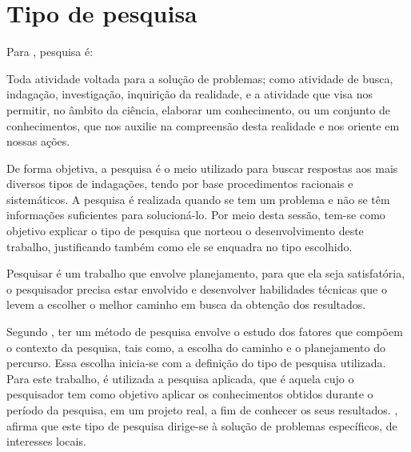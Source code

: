\section{Tipo de pesquisa}

\par Para , pesquisa é:

\begin{citacao}
	Toda atividade voltada para a solução de problemas; como atividade de busca, indagação, investigação, inquirição da realidade, e a atividade que visa nos permitir, no âmbito da ciência, elaborar um  conhecimento, ou um conjunto de conhecimentos, que nos auxilie na compreensão desta realidade e nos oriente em nossas ações.
\end{citacao}


\par De forma objetiva, a pesquisa é o meio utilizado para buscar respostas aos mais diversos tipos de indagações, tendo por base procedimentos racionais e sistemáticos. A pesquisa é realizada quando se tem um problema e não se têm informações suficientes para solucioná-lo. Por meio desta sessão, tem-se como objetivo explicar o tipo de pesquisa que norteou o desenvolvimento deste trabalho, justificando também como ele se enquadra no tipo escolhido.

\par Pesquisar é um trabalho que envolve planejamento, para que ela seja satisfatória, o pesquisador precisa estar envolvido e  desenvolver habilidades técnicas que o levem a escolher o melhor caminho em busca da obtenção dos resultados.

\par Segundo , ter um método de pesquisa envolve o estudo dos fatores que compõem o contexto da pesquisa, tais como, a escolha do caminho e o planejamento do percurso. Essa escolha inicia-se com a definição do tipo de pesquisa utilizada. Para este trabalho, é utilizada a pesquisa aplicada, que é aquela cujo o pesquisador tem como objetivo aplicar os conhecimentos obtidos durante o período da pesquisa, em um projeto real, a fim de conhecer os seus resultados. , afirma que este tipo de pesquisa dirige-se à solução de problemas específicos, de interesses locais.

